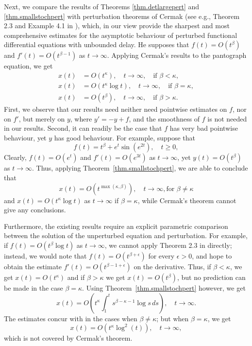 \documentclass[a4paper,10pt,reqno]{amsart}
\numberwithin{equation}{section}
\theoremstyle{definition}
\theoremstyle{remark}
\DeclareMathOperator{\1}{\mathbbm 1}
\begin{document}
Next, we compare the results of Theorems \ref{thm.detlargepert} and \ref{thm.smallstochpert}  with perturbation theorems of Cermak (see e.g., Theorem 2.3 and Example 4.1 in \cite{cermak}), which, in our view provide the sharpest and most comprehensive estimates for the asymptotic behaviour of perturbed functional differential equations with unbounded delay. He supposes that $f(t)=O(t^\beta)$ and $f'(t)=O(t^{\beta-1})$ as $t\to\infty$. Applying Cermak's results to the pantograph equation, we get  
\begin{align*}
x(t)&=O(t^\kappa), \quad t \to\infty, \quad \text{if $\beta<\kappa$},\\
x(t)&=O(t^\kappa\log t), \quad t \to\infty, \quad\text{if $\beta=\kappa$},\\
x(t)&=O(t^\beta), \quad t \to\infty, \quad\text{if $\beta>\kappa$}.
\end{align*}
First, we observe that our results need neither need pointwise estimates on $f$, nor on $f'$, but merely on $y$, where $y'=-y+f$, and the smoothness of $f$ is not needed in our results. Second, it can readily be the case that $f$ has very bad pointwise behaviour, yet $y$ has good behaviour. For example, suppose that 
\[
f(t)=t^{\beta}+e^{t}\sin(e^{2t}), \quad t\geq 0,
\] 
Clearly, $f(t)=O(e^t)$ and $f'(t)=O(e^{3t})$ as $t\to\infty$, yet $y(t)=O(t^\beta)$ as $t\to\infty$. Thus, applying Theorem~\ref{thm.smallstochpert}, we are able to conclude that 
\[
x(t)=O(t^{\max(\kappa,\beta)}), \quad t\to\infty, \text{for $\beta\neq \kappa$} 
\]
and $x(t)=O(t^\kappa\log t)$ as $t\to\infty$ if $\beta=\kappa$, while Cermak's theorem cannot give any conclusions.

Furthermore, the existing results require an explicit parametric comparison between the solution of the unperturbed equation and perturbation. For example, if $f(t)=O(t^\beta\log t)$ as $t\to\infty$, we cannot apply Theorem 2.3 in \cite{cermak} directly; instead, we would note that $f(t)=O(t^{\beta+\epsilon})$ for every $\epsilon>0$, and hope to obtain the estimate  $f'(t)=O(t^{\beta-1+\epsilon})$ on the derivative. Thus, if $\beta<\kappa$, we get $x(t)=O(t^\kappa)$ and if $\beta>\kappa$ we get $x(t)=O(t^\beta)$, but no prediction can be made in the case $\beta=\kappa$. Using Theorem~\ref{thm.smallstochpert} however,  we get 
\[
x(t)=O\left(t^\kappa\int_1^t s^{\beta-\kappa-1}\log s\,ds\right), \quad t\to\infty.
\]   
The estimates concur with \cite[Theorem 2.3]{cermak} in the cases when $\beta\neq \kappa$; but when $\beta=\kappa$, we get 
\[
x(t)=O(t^\kappa \log^2(t)), \quad t\to\infty,
\]
which is not covered by Cermak's theorem. 
\end{document}
